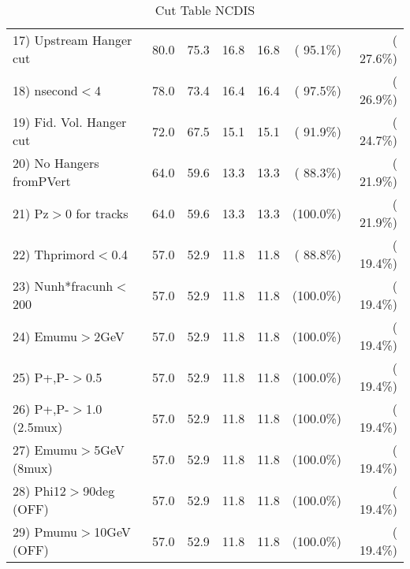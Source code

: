 \begin{table}[h!]
\begin{tabular}{||l||r|r|r|r|r|r||}
 17) Upstream Hanger cut  &         80.0 &         75.3 &         16.8 &         16.8 & ( 95.1\%) & ( 27.6\%) \\
 18) nsecond$<$4          &         78.0 &         73.4 &         16.4 &         16.4 & ( 97.5\%) & ( 26.9\%) \\
 19) Fid. Vol. Hanger cut &         72.0 &         67.5 &         15.1 &         15.1 & ( 91.9\%) & ( 24.7\%) \\
 20) No Hangers fromPVert &         64.0 &         59.6 &         13.3 &         13.3 & ( 88.3\%) & ( 21.9\%) \\
 21) Pz$>$0 for tracks    &         64.0 &         59.6 &         13.3 &         13.3 & (100.0\%) & ( 21.9\%) \\
 22) Thprimord$<$0.4      &         57.0 &         52.9 &         11.8 &         11.8 & ( 88.8\%) & ( 19.4\%) \\
 23) Nunh*fracunh$<$200   &         57.0 &         52.9 &         11.8 &         11.8 & (100.0\%) & ( 19.4\%) \\
 24) Emumu$>$2GeV         &         57.0 &         52.9 &         11.8 &         11.8 & (100.0\%) & ( 19.4\%) \\
 25) P+,P-$>$0.5          &         57.0 &         52.9 &         11.8 &         11.8 & (100.0\%) & ( 19.4\%) \\
 26) P+,P-$>$1.0 (2.5mux) &         57.0 &         52.9 &         11.8 &         11.8 & (100.0\%) & ( 19.4\%) \\
 27) Emumu$>$5GeV  (8mux) &         57.0 &         52.9 &         11.8 &         11.8 & (100.0\%) & ( 19.4\%) \\
 28) Phi12$>$90deg  (OFF) &         57.0 &         52.9 &         11.8 &         11.8 & (100.0\%) & ( 19.4\%) \\
 29) Pmumu$>$10GeV  (OFF) &         57.0 &         52.9 &         11.8 &         11.8 & (100.0\%) & ( 19.4\%) \\
 \hline
 \hline
 \end{tabular}
 \caption{Cut Table  NCDIS    }
 \label{tab-cutcohjpsi-mumu_ncdis}
 \end{table}
